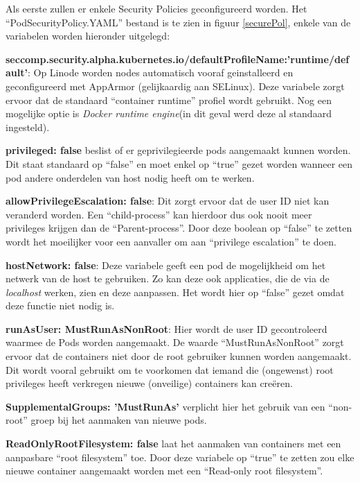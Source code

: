 Als eerste zullen er enkele Security Policies geconfigureerd worden. Het ``PodSecurityPolicy.YAML'' bestand is te zien in figuur \ref{securePol}, enkele van de variabelen worden hieronder uitgelegd: 


\textbf{seccomp.security.alpha.kubernetes.io/defaultProfileName:'runtime/default'}: Op Linode worden nodes automatisch vooraf geinstalleerd en geconfigureerd met AppArmor (gelijkaardig aan SELinux). Deze variabele zorgt ervoor dat de standaard ``container runtime'' profiel wordt gebruikt. Nog een mogelijke optie is \textit{Docker runtime engine}(in dit geval werd deze al standaard ingesteld).

\textbf{privileged: false} beslist of er geprivilegieerde pods aangemaakt kunnen worden. Dit staat standaard op ``false'' en moet enkel op ``true'' gezet worden wanneer een pod andere onderdelen van host nodig heeft om te werken. 

\textbf{allowPrivilegeEscalation: false}: Dit zorgt ervoor dat de user ID niet kan veranderd worden. Een ``child-process'' kan hierdoor dus ook nooit meer privileges krijgen dan de ``Parent-process''. Door deze boolean op ``false'' te zetten wordt het moeilijker voor een aanvaller om aan ``privilege escalation'' te doen.

\textbf{hostNetwork: false}: Deze variabele geeft een pod de mogelijkheid om het netwerk van de host te gebruiken. Zo kan deze ook applicaties, die de via de \textit{localhost} werken, zien en deze aanpassen. Het wordt hier op ``false'' gezet omdat deze functie niet nodig is.

\textbf{runAsUser: MustRunAsNonRoot}: Hier wordt de user ID gecontroleerd waarmee de Pods worden aangemaakt. De waarde ``MustRunAsNonRoot'' zorgt ervoor dat de containers niet door de root gebruiker kunnen worden aangemaakt. Dit wordt vooral gebruikt om te voorkomen dat iemand die (ongewenst) root privileges heeft verkregen nieuwe (onveilige) containers kan creëren.

\textbf{SupplementalGroups: 'MustRunAs'} verplicht hier het gebruik van een ``non-root'' groep bij het aanmaken van nieuwe pods. 

\textbf{ReadOnlyRootFilesystem: false} laat het aanmaken van containers met een aanpasbare ``root filesystem'' toe. Door deze variabele op ``true'' te zetten zou elke nieuwe container aangemaakt worden met een ``Read-only root filesystem''.

